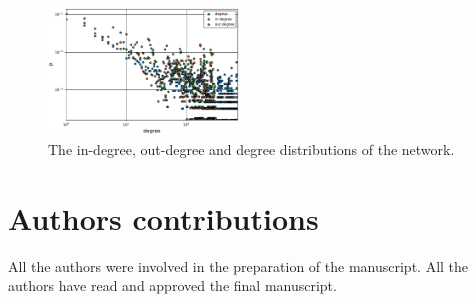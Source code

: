 \begin{figure}
  \includegraphics[width=0.45\textwidth]{../plots/degree}
  \caption{The in-degree, out-degree and degree distributions of the network.}
  \label{fig:dist}
\end{figure}


\section{Authors contributions}
All the authors were involved in the preparation of the manuscript.
All the authors have read and approved the final manuscript.









